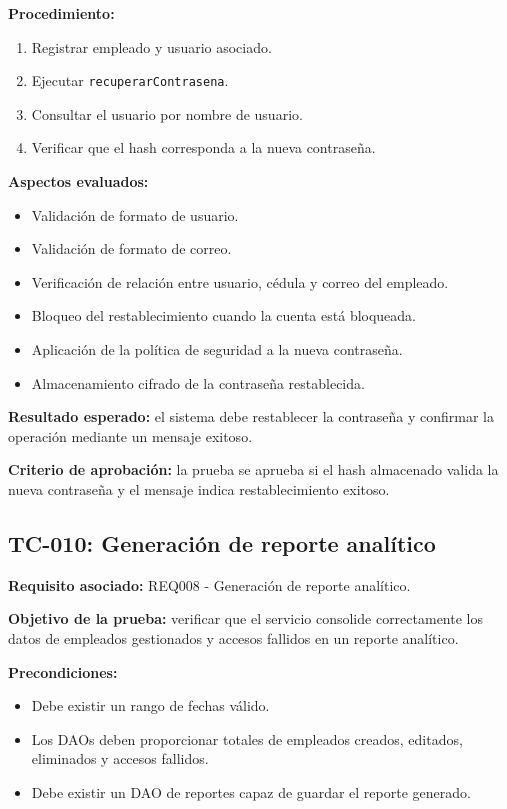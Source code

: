 \documentclass[12pt,a4paper]{article}
\begin{document}
\textbf{Procedimiento:}
\begin{enumerate}[leftmargin=*]
    \item Registrar empleado y usuario asociado.
    \item Ejecutar \texttt{recuperarContrasena}.
    \item Consultar el usuario por nombre de usuario.
    \item Verificar que el hash corresponda a la nueva contraseña.
\end{enumerate}

\textbf{Aspectos evaluados:}
\begin{itemize}[leftmargin=*]
    \item Validación de formato de usuario.
    \item Validación de formato de correo.
    \item Verificación de relación entre usuario, cédula y correo del empleado.
    \item Bloqueo del restablecimiento cuando la cuenta está bloqueada.
    \item Aplicación de la política de seguridad a la nueva contraseña.
    \item Almacenamiento cifrado de la contraseña restablecida.
\end{itemize}

\textbf{Resultado esperado:} el sistema debe restablecer la contraseña y confirmar la operación mediante un mensaje exitoso.

\textbf{Criterio de aprobación:} la prueba se aprueba si el hash almacenado valida la nueva contraseña y el mensaje indica restablecimiento exitoso.

\subsection{TC-010: Generación de reporte analítico}

\textbf{Requisito asociado:} REQ008 - Generación de reporte analítico.

\textbf{Objetivo de la prueba:} verificar que el servicio consolide correctamente los datos de empleados gestionados y accesos fallidos en un reporte analítico.

\textbf{Precondiciones:}
\begin{itemize}[leftmargin=*]
    \item Debe existir un rango de fechas válido.
    \item Los DAOs deben proporcionar totales de empleados creados, editados, eliminados y accesos fallidos.
    \item Debe existir un DAO de reportes capaz de guardar el reporte generado.
\end{itemize}
\end{document}
